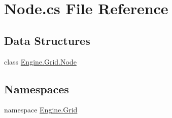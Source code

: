\hypertarget{a00092}{}\section{Node.\+cs File Reference}
\label{a00092}
\subsection*{Data Structures}
\begin{DoxyCompactItemize}
\item 
class \hyperlink{a00414}{Engine.\+Grid.\+Node}
\end{DoxyCompactItemize}
\subsection*{Namespaces}
\begin{DoxyCompactItemize}
\item 
namespace \hyperlink{a00251}{Engine.\+Grid}
\end{DoxyCompactItemize}
